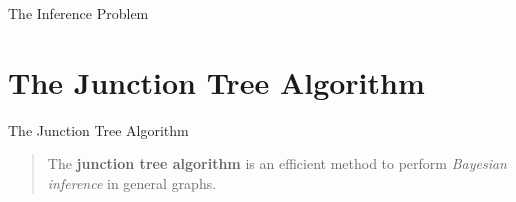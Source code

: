 \documentclass[10pt,usenames,dvipsnames]{beamer}
\begin{document}
\begin{frame}{The Inference Problem}
  \begin{figure}
    \vspace{0.5cm} %
    \scalebox{0.7}{}
  \end{figure}
\end{frame}

\section{The Junction Tree Algorithm}

\begin{frame}{The Junction Tree Algorithm}
    \begin{quote} 
      The \textbf{junction tree algorithm} is an efficient method to perform
      \textit{Bayesian inference} in general graphs.
    \end{quote}
\end{frame}
\end{document}
